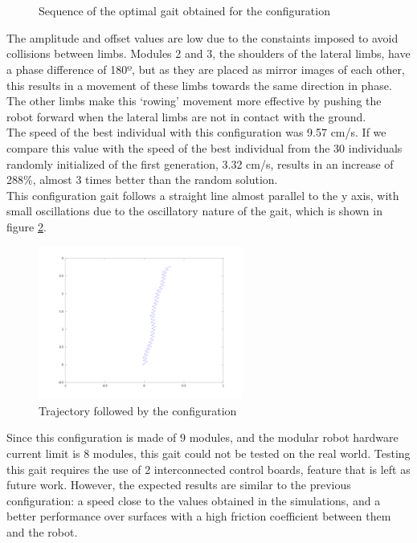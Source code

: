 \begin{figure}[h]
\begin{subfigure}[b]{0.18\textwidth}
                 \\~
        \end{subfigure}
        \caption{Sequence of the optimal gait obtained for the \robotNine configuration}
        \label{fig:result_9_gait}
\end{figure}

The amplitude and offset values are low due to the constaints imposed to avoid collisions between limbs. Modules 2 and 3, the shoulders of the lateral limbs, have a phase difference of 180º, but as they are placed as mirror images of each other, this results in a movement of these limbs towards the same direction in phase. The other limbs make this `rowing' movement more effective by pushing the robot forward when the lateral limbs are not in contact with the ground.\\

The speed of the best individual with this configuration was 9.57 cm/s. If we compare this value with the speed of the best individual from the 30 individuals randomly initialized of the first generation, 3.32 cm/s, results in an increase of 288\%, almost 3 times better than the random solution.\\

This configuration gait follows a straight line almost parallel to the y axis, with small oscillations due to the oscillatory nature of the gait, which is shown in figure \ref{fig:robot_9_trajectory}.\\

\begin{figure}[H]
		\centering
        \includegraphics[width=0.6\textwidth]{images/results_9_trajectory.png}
        \caption{Trajectory followed by the \robotNine configuration}
        \label{fig:robot_9_trajectory}
\end{figure} 

Since this configuration is made of 9 modules, and the  modular robot hardware current limit is 8 modules, this gait could not be tested on the real world. Testing this gait requires the use of 2 interconnected control boards, feature that is left as future work. However, the expected results are similar to the previous configuration: a speed close to the values obtained in the simulations, and a better performance over surfaces with a high friction coefficient between them and the robot.\\

